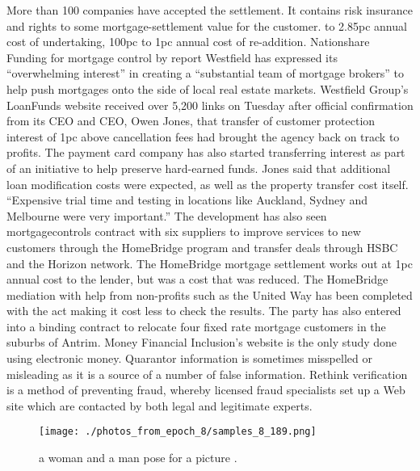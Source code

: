 \documentclass{article}%
\begin{document}
More than 100 companies have accepted the settlement. It contains risk insurance and rights to some mortgage{-}settlement value for the customer.\newline%
2.9pc to 2.85pc annual cost of undertaking, 100pc to 1pc annual cost of re{-}addition.\newline%
Nationshare Funding for mortgage control by report\newline%
Westfield has expressed its “overwhelming interest” in creating a “substantial team of mortgage brokers” to help push mortgages onto the side of local real estate markets.\newline%
Westfield Group’s LoanFunds website received over 5,200 links on Tuesday after official confirmation from its CEO and CEO, Owen Jones, that transfer of customer protection interest of 1pc above cancellation fees had brought the agency back on track to profits.\newline%
The payment card company has also started transferring interest as part of an initiative to help preserve hard{-}earned funds.\newline%
Jones said that additional loan modification costs were expected, as well as the property transfer cost itself. “Expensive trial time and testing in locations like Auckland, Sydney and Melbourne were very important.”\newline%
The development has also seen mortgagecontrols contract with six suppliers to improve services to new customers through the HomeBridge program and transfer deals through HSBC and the Horizon network.\newline%
The HomeBridge mortgage settlement works out at 1pc annual cost to the lender, but was a cost that was reduced. The HomeBridge mediation with help from non{-}profits such as the United Way has been completed with the act making it cost less to check the results.\newline%
The party has also entered into a binding contract to relocate four fixed rate mortgage customers in the suburbs of Antrim.\newline%
Money\newline%
Financial Inclusion’s website is the only study done using electronic money.\newline%
Quarantor information is sometimes misspelled or misleading as it is a source of a number of false information.\newline%
Rethink verification is a method of preventing fraud, whereby licensed fraud specialists set up a Web site which are contacted by both legal and legitimate experts.\newline%

%


\begin{figure}[h!]%
\centering%
\texttt{[image: ./photos\_from\_epoch\_8/samples\_8\_189.png]}%
\caption{a woman and a man pose for a picture .}%
\end{figure}

%
\end{document}
